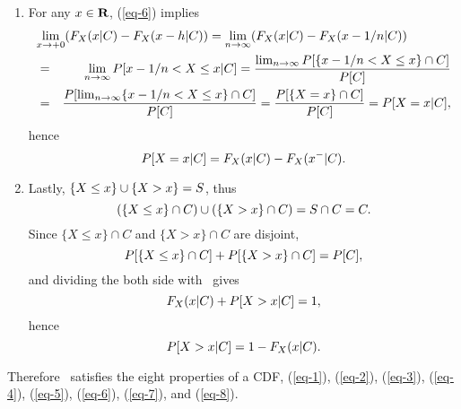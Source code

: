 \begin{enumerate}
\begin{solution}
\begin{enumerate}
		\item For any $x\in{\mbox{\bf R}}$,
		(\ref{eq-6}) implies
		\begin{eqnarray*}
			\lefteqn{
			\lim_{x\to+0} (\ccdfxk{x}{C} - \ccdfxk{x-h}{C})
			= \lim_{n\to\infty} (\ccdfxk{x}{C} - \ccdfxk{x-1/n}{C})
			}
			\\
			&=& \lim_{n\to\infty} \cpr{x-1/n < X \leq x}{C}
			= \frac{ \lim_{n\to\infty}
				\pr{\{x-1/n < X \leq x\}\cap C}}{\pr{C}}
			\\&=& \frac{ \pr{
			\lim_{n\to\infty} \{x-1/n < X \leq x\}\cap C}}{\pr{C}}
			= \frac{ \pr{ \{X=x\} \cap C}}{\pr{C}}
			= \cpr{X=x}{C},
		\end{eqnarray*}
		hence
		\begin{equation}
		\label{eq-7}
			P[X=x|C] = F_{X}(x|C) - F_{X}(x^-|C).
		\end{equation}

		\item Lastly,
		$\{ X \leq x \} \cup \{X > x\} = S$,
		thus
		\[
			(\{ X \leq x \} \cap C)
			\cup
			(\{X > x\} \cap C) = S \cap C = C.
		\]
		Since $\{ X \leq x \} \cap C$ and $\{X > x\} \cap C$ are disjoint,
		\[
			P[\{ X \leq x \} \cap C]
			+
			P[\{X > x\} \cap C] = P[C],
		\]
		and dividing the both side with \ gives
		\[
			F_{X}(x|C) + P[X>x|C] = 1,
		\]
		hence
		\begin{equation}
		\label{eq-8}
			P[X>x|C] = 1 - F_{X}(x|C).
		\end{equation}
	\end{enumerate}
	\renewcommand{\labelenumii}{(\alpha{enumii})}

	Therefore \ satisfies the eight properties of a CDF,
	(\ref{eq-1}),
	(\ref{eq-2}),
	(\ref{eq-3}),
	(\ref{eq-4}),
	(\ref{eq-5}),
	(\ref{eq-6}),
	(\ref{eq-7}),
	and (\ref{eq-8}).
	\end{solution}
	\fi



\end{enumerate}
